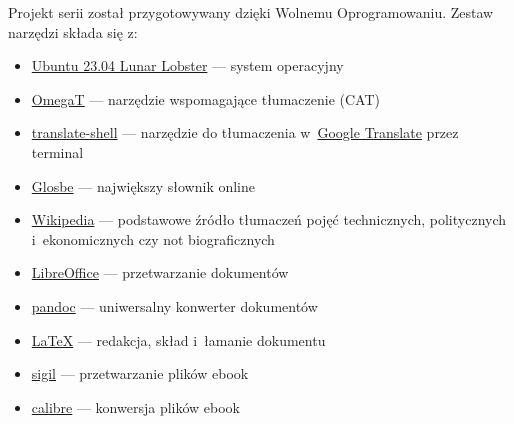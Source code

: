 \documentclass[oneside,polish,11pt,rmheadings]{mwbk}
\begin{document}
Projekt serii został przygotowywany dzięki Wolnemu Oprogramowaniu. Zestaw narzędzi składa się z:
\begin{itemize}
\item \href{https://ubuntu.com/}{Ubuntu 23.04 Lunar Lobster} --- system operacyjny
\item \href{https://omegat.org/}{OmegaT} --- narzędzie wspomagające tłumaczenie (CAT)
\item \href{https://github.com/soimort/translate-shell}{translate-shell} --- narzędzie do tłumaczenia w~\href{https://translate.google.pl}{Google Translate} przez terminal 
\item \href{https://glosbe.com/en/pl}{Glosbe} --- największy słownik online
\item \href{https://www.wikipedia.org/}{Wikipedia} --- podstawowe źródło tłumaczeń pojęć technicznych, politycznych i~ekonomicznych czy not biograficznych
\item \href{https://www.libreoffice.org/}{LibreOffice} --- przetwarzanie dokumentów 
\item \href{http://pandoc.org}{pandoc} --- uniwersalny konwerter dokumentów 
\item \href{https://www.latex-project.org/}{LaTeX} --- redakcja, skład i~łamanie dokumentu
\item \href{https://sigil-ebook.com/}{sigil} --- przetwarzanie plików ebook
\item \href{https://calibre-ebook.com/}{calibre} --- konwersja plików ebook
\end{itemize}
\end{document}
